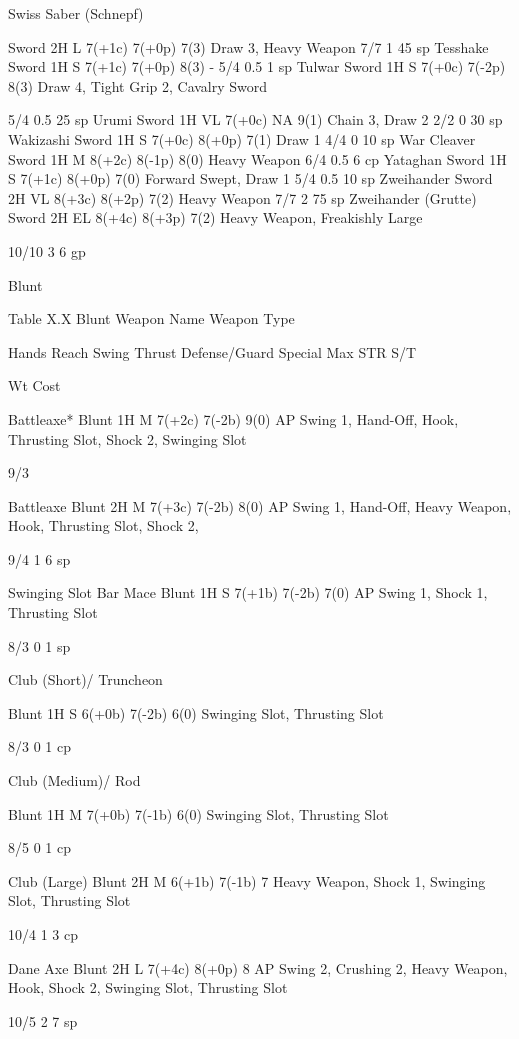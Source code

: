 \documentclass[oneside,11pt,english]{book}
\begin{document}
Swiss Saber 
(Schnepf) 

Sword 2H L 7(+1c) 7(+0p) 7(3) Draw 3, Heavy Weapon 7/7 1 45 
sp 
Tesshake Sword 1H S 7(+1c) 7(+0p) 8(3) - 5/4 0.5 1 sp 
Tulwar Sword 1H S 7(+0c) 7(-2p) 8(3) Draw 4, Tight Grip 2, 
Cavalry Sword 

5/4 0.5 25 
sp 
Urumi Sword 1H VL 7(+0c) NA 9(1) Chain 3, Draw 2 2/2 0 30 
sp 
Wakizashi Sword 1H S 7(+0c) 8(+0p) 7(1) Draw 1 4/4 0 10 
sp 
War Cleaver Sword 1H M 8(+2c) 8(-1p) 8(0) Heavy Weapon 6/4 0.5 6 cp 
Yataghan Sword 1H S 7(+1c) 8(+0p) 7(0) Forward Swept, Draw 1 5/4 0.5 10 
sp 
Zweihander Sword 2H VL 8(+3c) 8(+2p) 7(2) Heavy Weapon 7/7 2 75 
sp 
Zweihander (Grutte) Sword 2H EL 8(+4c) 8(+3p) 7(2) Heavy Weapon, 
Freakishly Large 

10/10 3 6 gp 

 

Blunt 

 
Table X.X Blunt 
Weapon Name Weapon 
Type 

Hands Reach Swing Thrust Defense/Guard Special Max 
STR 
S/T 

Wt Cost 

Battleaxe* Blunt 1H M 7(+2c) 7(-2b) 9(0) AP Swing 1, Hand-Off, 
Hook, Thrusting Slot, 
Shock 2, Swinging Slot 

9/3 

Battleaxe Blunt 2H M 7(+3c) 7(-2b) 8(0) AP Swing 1, Hand-Off, 
Heavy Weapon, Hook, 
Thrusting Slot, Shock 2, 

9/4 1 6 sp 


Swinging Slot 
Bar Mace Blunt 1H S 7(+1b) 7(-2b) 7(0) AP Swing 1, Shock 1, 
Thrusting Slot 

8/3 0 1 sp 

Club (Short)/ 
Truncheon 

Blunt 1H S 6(+0b) 7(-2b) 6(0) Swinging Slot, 
Thrusting Slot 

8/3 0 1 cp 

Club 
(Medium)/ 
Rod 

Blunt 1H M 7(+0b) 7(-1b) 6(0) Swinging Slot, 
Thrusting Slot 

8/5 0 1 cp 

Club (Large) Blunt 2H M 6(+1b) 7(-1b) 7 Heavy Weapon, Shock 
1, Swinging Slot, 
Thrusting Slot 

10/4 1 3 cp 

Dane Axe Blunt 2H L 7(+4c) 8(+0p) 8 AP Swing 2, Crushing 
2, Heavy Weapon, 
Hook, Shock 2, 
Swinging Slot, 
Thrusting Slot 

10/5 2 7 sp 
\end{document}

